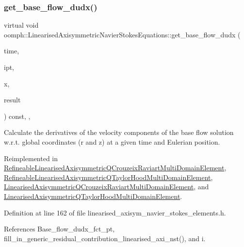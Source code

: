 \subsubsection{\texorpdfstring{get\+\_\+base\+\_\+flow\+\_\+dudx()}{get\_base\_flow\_dudx()}}
{\footnotesize\ttfamily virtual void oomph\+::\+Linearised\+Axisymmetric\+Navier\+Stokes\+Equations\+::get\+\_\+base\+\_\+flow\+\_\+dudx (\begin{DoxyParamCaption}\item[{const double \&}]{time,  }\item[{const unsigned \&}]{ipt,  }\item[{const \hyperlink{classoomph_1_1Vector}{Vector}$<$ double $>$ \&}]{x,  }\item[{\hyperlink{classoomph_1_1DenseMatrix}{Dense\+Matrix}$<$ double $>$ \&}]{result }\end{DoxyParamCaption}) const\hspace{0.3cm}{\ttfamily [inline]}, {\ttfamily [protected]}, {\ttfamily [virtual]}}



Calculate the derivatives of the velocity components of the base flow solution w.\+r.\+t. global coordinates (r and z) at a given time and Eulerian position. 



Reimplemented in \hyperlink{classRefineableLinearisedAxisymmetricQCrouzeixRaviartMultiDomainElement_aa188100d2012d19360e60d514089cdd4}{Refineable\+Linearised\+Axisymmetric\+Q\+Crouzeix\+Raviart\+Multi\+Domain\+Element}, \hyperlink{classRefineableLinearisedAxisymmetricQTaylorHoodMultiDomainElement_ab93338e4fda9be14f7f1c34824ddc905}{Refineable\+Linearised\+Axisymmetric\+Q\+Taylor\+Hood\+Multi\+Domain\+Element}, \hyperlink{classLinearisedAxisymmetricQCrouzeixRaviartMultiDomainElement_a69af588f46bb76f29ace74218504fe8d}{Linearised\+Axisymmetric\+Q\+Crouzeix\+Raviart\+Multi\+Domain\+Element}, and \hyperlink{classLinearisedAxisymmetricQTaylorHoodMultiDomainElement_a88bdf14ec298be7083e97d0312d7e968}{Linearised\+Axisymmetric\+Q\+Taylor\+Hood\+Multi\+Domain\+Element}.



Definition at line 162 of file linearised\+\_\+axisym\+\_\+navier\+\_\+stokes\+\_\+elements.\+h.



References Base\+\_\+flow\+\_\+dudx\+\_\+fct\+\_\+pt, fill\+\_\+in\+\_\+generic\+\_\+residual\+\_\+contribution\+\_\+linearised\+\_\+axi\+\_\+nst(), and i.



